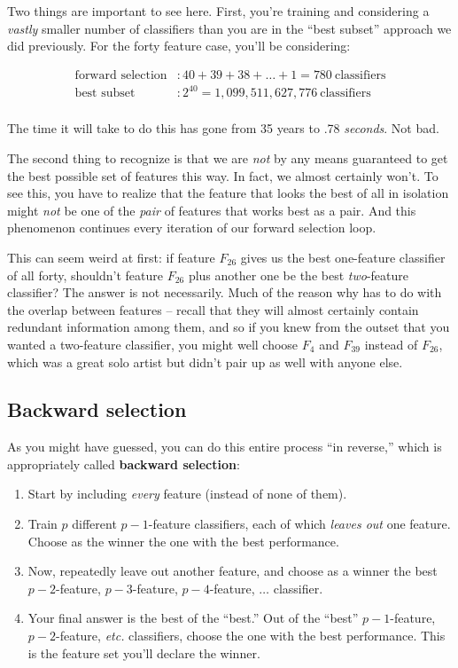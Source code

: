 Two things are important to see here. First, you're training and considering a
\textit{vastly} smaller number of classifiers than you are in the ``best
subset'' approach we did previously. For the forty feature case, you'll be
considering:

\begin{align*}
\textrm{forward selection}&: 40 + 39 + 38 + \dots + 1 = 780\ \textrm{classifiers}\\
\textrm{best subset}&: 2^{40} = 1,099,511,627,776\ \textrm{classifiers}\\
\end{align*}

The time it will take to do this has gone from 35 years to .78
\textit{seconds}. Not bad.

The second thing to recognize is that we are \textit{not} by any means
guaranteed to get the best possible set of features this way. In fact, we
almost certainly won't. To see this, you have to realize that the feature that
looks the best of all in isolation might \textit{not} be one of the
\textit{pair} of features that works best as a pair. And this phenomenon
continues every iteration of our forward selection loop.

This can seem weird at first: if feature $F_{26}$ gives us the best
one-feature classifier of all forty, shouldn't feature $F_{26}$ plus another
one be the best \textit{two}-feature classifier? The answer is not
necessarily. Much of the reason why has to do with the overlap between
features -- recall that they will almost certainly contain redundant
information among them, and so if you knew from the outset that you wanted a
two-feature classifier, you might well choose $F_4$ and $F_{39}$ instead of
$F_{26}$, which was a great solo artist but didn't pair up as well with anyone
else.

\subsection{Backward selection}

As you might have guessed, you can do this entire process ``in reverse,''
which is appropriately called \textbf{backward selection}:

\begin{enumerate}
\itemsep.1em
\item Start by including \textit{every} feature (instead of none of them).
\item Train $p$ different $p-1$-feature classifiers, each of which
\textit{leaves out} one feature. Choose as the winner the one with the
best performance.
\item Now, repeatedly leave out another feature, and choose as a winner the
best $p-2$-feature, $p-3$-feature, $p-4$-feature, $\dots$ classifier.
\item Your final answer is the best of the ``best.'' Out of the ``best''
$p-1$-feature, $p-2$-feature, \textit{etc.} classifiers, choose the one with
the best performance. This is the feature set you'll declare the winner.
\end{enumerate}

